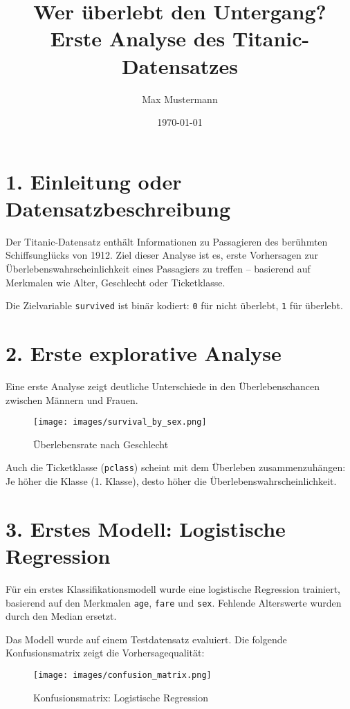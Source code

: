 \documentclass[12pt,a4paper]{article}
\title{Wer überlebt den Untergang? \\ Erste Analyse des Titanic-Datensatzes}
\author{Max Mustermann}
\date{\today}
\begin{document}
\maketitle

\section*{1. Einleitung oder Datensatzbeschreibung}

Der Titanic-Datensatz enthält Informationen zu Passagieren des berühmten Schiffsunglücks von 1912. Ziel dieser Analyse ist es, erste Vorhersagen zur Überlebenswahrscheinlichkeit eines Passagiers zu treffen – basierend auf Merkmalen wie Alter, Geschlecht oder Ticketklasse. 

Die Zielvariable \texttt{survived} ist binär kodiert: \texttt{0} für nicht überlebt, \texttt{1} für überlebt.

\section*{2. Erste explorative Analyse}

Eine erste Analyse zeigt deutliche Unterschiede in den Überlebenschancen zwischen Männern und Frauen.

\begin{figure}[H]
    \centering
    \texttt{[image: images/survival\_by\_sex.png]}
    \caption{Überlebensrate nach Geschlecht}
\end{figure}

Auch die Ticketklasse (\texttt{pclass}) scheint mit dem Überleben zusammenzuhängen: Je höher die Klasse (1. Klasse), desto höher die Überlebenswahrscheinlichkeit.

\section*{3. Erstes Modell: Logistische Regression}

Für ein erstes Klassifikationsmodell wurde eine logistische Regression trainiert, basierend auf den Merkmalen \texttt{age}, \texttt{fare} und \texttt{sex}. Fehlende Alterswerte wurden durch den Median ersetzt.

Das Modell wurde auf einem Testdatensatz evaluiert. Die folgende Konfusionsmatrix zeigt die Vorhersagequalität:

\begin{figure}[H]
    \centering
    \texttt{[image: images/confusion\_matrix.png]}
    \caption{Konfusionsmatrix: Logistische Regression}
\end{figure}
\end{document}
